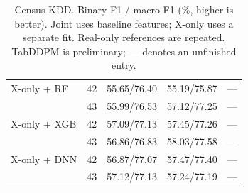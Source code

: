 \begin{table}[ht]
{\begin{tabular}{lrrrr}
X-only + RF & 42 & 55.65/76.40 & 55.19/75.87 & --- \\
 & 43 & 55.99/76.53 & 57.12/77.25 & --- \\
X-only + XGB & 42 & 57.09/77.13 & 57.45/77.26 & --- \\
 & 43 & 56.86/76.83 & 58.03/77.58 & --- \\
X-only + DNN & 42 & 56.87/77.07 & 57.47/77.40 & --- \\
 & 43 & 57.12/77.13 & 57.24/77.19 & --- \\
\bottomrule
\end{tabular}
}
\caption{Census KDD. Binary F1 / macro F1 (\%, higher is better). Joint uses baseline features; X-only uses a separate fit. Real-only references are repeated. TabDDPM is preliminary; --- denotes an unfinished entry.}
\label{tab:census-kdd}
\end{table}
